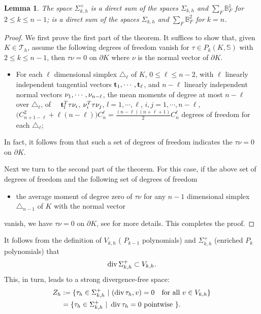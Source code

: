 \documentclass{amsart}
\newtheorem{lemma}{Lemma}[section]
\def\a#1{\begin{align*}#1\end{align*}} \def\an#1{\begin{align}#1\end{align}}
\numberwithin{table}{section}
\numberwithin{figure}{section}
\def\boxit#1{\vbox{\hrule height1pt \hbox{\vrule width1pt\kern1pt
     #1\kern1pt\vrule width1pt}\hrule height1pt }}
\def\lab#1{\boxit{\small #1}\label{#1}}
\def\mref#1{\boxit{\small #1}\ref{#1}}
\def\meqref#1{\boxit{\small #1}\eqref{#1}}
\def\lab#1{\label{#1}} \def\mref#1{\ref{#1}} \def\meqref#1{\eqref{#1}}
\begin{document}
\begin{lemma}\label{lemma4.1} The space $\Sigma_{k, h}^+$ is a direct sum of the spaces $\Sigma_{k, h}$ and $\sum\limits_{F} \mathbb{B}_F^1$ for
$2\leq k\leq n-1$; is a direct sum of the spaces $\Sigma_{k, h}$ and $\sum\limits_{F} \mathbb{B}_F^2$ for
$k=n$.
\end{lemma}
\begin{proof} We first  prove the first part of the theorem. It suffices to show that, given $K\in \mathcal{T}_h$, assume    the following degrees of freedom vanish  for $\tau\in P_k(K, \mathbb{S})$ with $2\leq k\leq n-1$, then $\tau\nu=0$ on
  $\partial K$ where $\nu$ is the   normal vector of $\partial K$.
\begin{itemize}
 \item For each $\ell$ dimensional simplex $\triangle_\ell$ of $K$, $0\leq \ell\leq n-2$,  with $\ell$ linearly independent tangential vectors $\mathbf{t}_1, \cdots, \mathbf{t}_\ell$, and $n-\ell$ linearly  independent normal vectors $\mathbf{\nu}_1, \cdots, \mathbf{\nu}_{n-\ell}$, the mean moments of degree at most $n-\ell$ over $\triangle_\ell$, of~~ $\mathbf{t}_l^T\tau \mathbf{\nu}_i$, $\mathbf{\nu}_i^T\tau\mathbf{\nu}_j$, $l=1, \cdots, \ell$, $i,j=1, \cdots, n-\ell$,  $\big( C_{n+1-\ell}^2+\ell (n-\ell)\big) C_{n}^\ell=\frac{(n-\ell)(n+\ell+1)}{2}C_{n}^\ell$ degrees of freedom  for each $\triangle_\ell$;
 \end{itemize}
 In fact, it follows from \cite[Theorem 2.1]{Hu2014} that such a set of degrees of freedom indicates the $\tau\nu=0$ on
  $\partial K$.

  Next we turn to the second part of the theorem.  For this case, if the above set of degrees of freedom
  and  the following set of degrees of  freedom
   \begin{itemize}
   \item  the  average moment of  degree zero of $\tau \nu$ for any $n-1$ dimensional simplex $\triangle_{n-1}$ of $K$ with the   normal vector
   \end{itemize}
    vanish,  we have $\tau\nu=0$ on $\partial K$, see \cite[Theorem 2.1]{Hu2014} for more details.  This completes the proof.
\end{proof}

 It follows from the definition of $V_{k,h}$ ( $P_{k-1}$ polynomials)
    and $\Sigma_{k,h}^+$ (enriched $P_k$ polynomials) that
   \a{ \d  \Sigma_{k,h}^+ \subset V_{k,h}.}
This, in turn, leads to a strong divergence-free space:
 \an{ \lab {kernel}
    Z_h&:= \{\tau_h\in\Sigma_{k,h}^+ \ | \ (\d\tau_h, v)=0 \quad
	\hbox{for all } v\in V_{k,h}\}\\
    \nonumber
          &= \{\tau_h \in\Sigma_{k,h}^+ \ | \  \d \tau_h=0
    \hbox{\ pointwise } \}.
    }
\end{document}
